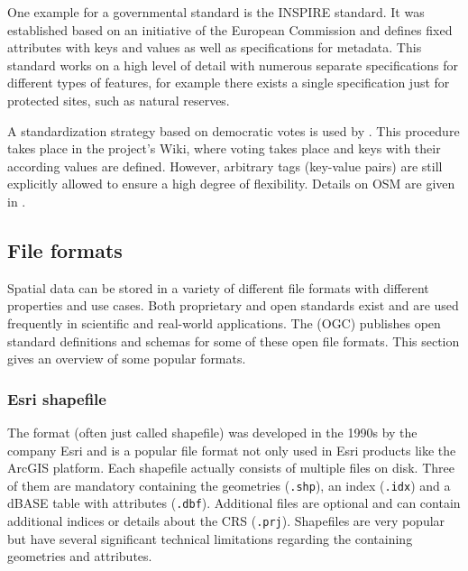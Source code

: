 			One example for a governmental standard is the INSPIRE standard.
			It was established based on an initiative of the European Commission and defines fixed attributes with keys and values as well as specifications for metadata.
			This standard works on a high level of detail with numerous separate specifications for different types of features, for example there exists a single specification just for protected sites, such as natural reserves\cite[31]{inspire-protected-sites}.
		
			A standardization strategy based on democratic votes is used by .
			This procedure takes place in the project's Wiki, where voting takes place and keys with their according values are defined.
			However, arbitrary tags (key-value pairs) are still explicitly allowed to ensure a high degree of flexibility\cite{osm-wiki-proposal-process}.
			Details on OSM are given in .
			
	\subsection{File formats}
	\label{subsec:file-formats}
	
		Spatial data can be stored in a variety of different file formats with different properties and use cases.
		Both proprietary and open standards exist and are used frequently in scientific and real-world applications.
		The  (OGC) publishes open standard definitions and schemas for some of these open file formats.
		This section gives an overview of some popular formats.
		
		\subsubsection{Esri shapefile}
		\label{subsubsec:shapefile}
		
			The  format (often just called shapefile) was developed in the 1990s by the company Esri and is a popular file format not only used in Esri products like the ArcGIS platform.
			Each shapefile actually consists of multiple files on disk\cite{esri-shapefile-file-ext-spec}.
			Three of them are mandatory containing the geometries (\texttt{.shp}), an index (\texttt{.idx}) and a dBASE table with attributes (\texttt{.dbf}).
			Additional files are optional and can contain additional indices or details about the CRS (\texttt{.prj}).
			Shapefiles are very popular\cite{spatial-file-formats-trends} but have several significant technical limitations regarding the containing geometries and attributes.
			
